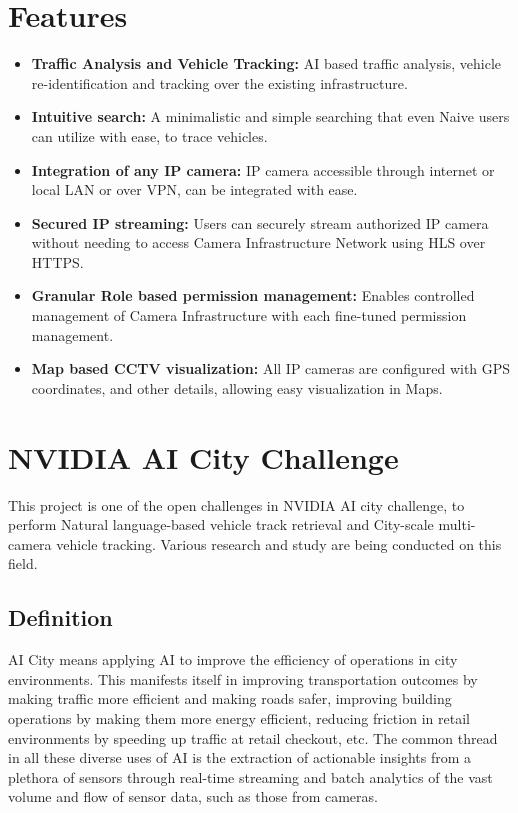 \section{Features}
\begin{itemize}
	\item \textbf{Traffic Analysis and Vehicle Tracking:} AI based traffic analysis, vehicle re-identification and tracking over the existing infrastructure. 
	\item \textbf{Intuitive search:} A minimalistic and simple searching that even Naive users can utilize with ease, to trace vehicles.   
	\item \textbf{Integration of any IP camera:} IP camera accessible through internet or local LAN or over VPN, can be integrated with ease.
	\item \textbf{Secured IP streaming:} Users can securely stream authorized IP camera without needing to access Camera Infrastructure Network using HLS over HTTPS.
	\item \textbf{Granular Role based permission management:} Enables controlled management of Camera Infrastructure with each fine-tuned permission management.
	\item  \textbf{Map based CCTV visualization:} All IP cameras are configured with GPS coordinates, and other details, allowing easy visualization in Maps. 
\end{itemize}


\section{NVIDIA AI City Challenge}
This project is one of the open challenges in NVIDIA AI city challenge, to perform Natural language-based vehicle track retrieval and City-scale multi-camera vehicle tracking. Various research and study are being conducted on this field.

\subsection*{Definition}
AI City means applying AI to improve the efficiency of operations in city environments. This manifests itself in improving transportation outcomes by making traffic more efficient and making roads safer, improving building operations by making them more energy efficient, reducing friction in retail environments by speeding up traffic at retail checkout, etc. The common thread in all these diverse uses of AI is the extraction of actionable insights from a plethora of sensors through real-time streaming and batch analytics of the vast volume and flow of sensor data, such as those from cameras.

